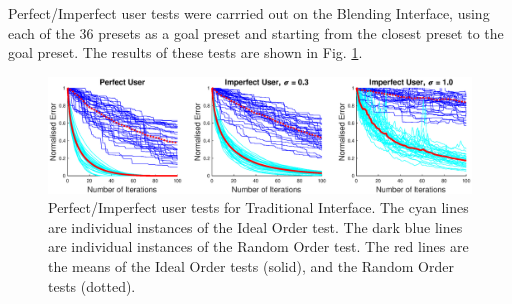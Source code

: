 \documentclass[11pt, oneside]{report}   	%
\begin{document}
Perfect/Imperfect user tests were carrried out on the Blending Interface, using each of the 36 presets as a goal preset and starting from the closest preset to the goal preset. The results of these tests are shown in Fig. \ref{fig:TradTest1}. 
\begin{figure}[h]
	\centering
	\hspace{-10pt}
	\includegraphics[trim  ={3cm, 0cm, 3cm, 0cm}, clip, width = 6.5in]{TradInterfaceTests1b.eps}
	\vspace{-5pt}
	\caption{Perfect/Imperfect user tests for Traditional Interface. The cyan lines are individual instances of the Ideal Order test. The  dark blue lines are individual instances of the Random Order test. The red lines are the means of the Ideal Order tests (solid), and the Random Order tests (dotted). }
	\label{fig:TradTest1}
	\vspace{-15pt}
\end{figure}
\end{document}
